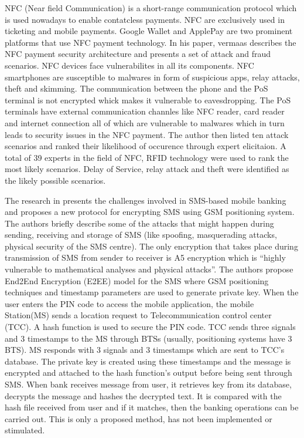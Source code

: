 \documentclass{mproj}
\begin{document}
NFC (Near field Communication) is a short-range communication protocol which is used nowadays to enable contatcless payments. NFC are exclusively used in ticketing and mobile payments\cite{vermaas}. Google Wallet and ApplePay are two prominent platforms that use NFC payment technology\cite{vermaas}. In his paper, vermaas \cite{vermaas} describes the NFC payment security architecture and presents a set of attack and fraud scenarios. NFC devices face vulnerabilites in all its components. NFC smartphones are susceptible to malwares in form of suspicious apps, relay attacks, theft and skimming. The communication between the phone and the PoS terminal is not encrypted whick makes it vulnerable to eavesdropping. The PoS terminals have external communication channles like NFC reader, card reader and internet connection all of which are vulnerable to malwares which in turn leads to security issues in the NFC payment. The author then listed ten attack scenarios and ranked their likelihood of occurence through expert elicitaion. A total of 39 experts in the field of NFC, RFID technology were used to rank the most likely scenarios. Delay of Service, relay attack and theft were identified as the likely possible scenarios.

The research in \cite{abolghasemi} presents the challenges involved in SMS-based mobile banking and proposes a new protocol for encrypting SMS using GSM positioning system. The authors briefly describe some of the attacks that might happen during sending, receiving and storage of SMS (like spoofing, masquerading attacks, physical security of the SMS centre). The only encryption that takes place during transmission of SMS from sender to receiver is A5 encryption which is “highly vulnerable to mathematical analyses and physical attacks”. The authors propose End2End Encryption (E2EE) model for the SMS where GSM positioning techniques and timestamp parameters are used to generate private key. When the user enters the PIN code to access the mobile application, the mobile Station(MS) sends a location request to Telecommunication control center (TCC). A hash function is used to secure the PIN code. TCC sends three signals and 3 timestamps to the MS through BTSs (usually, positioning systems have 3 BTS). MS responds with 3 signals and 3 timestamps which are sent to TCC’s database. The private key is created using these timestamps and the message is encrypted and attached to the hash function’s output before being sent through SMS. When bank receives message from user, it retrieves key from its database, decrypts the message and hashes the decrypted text. It is compared with the hash file received from user and if it matches, then the banking operations can be carried out. This is only a proposed method, has not been implemented or stimulated.
\end{document}
